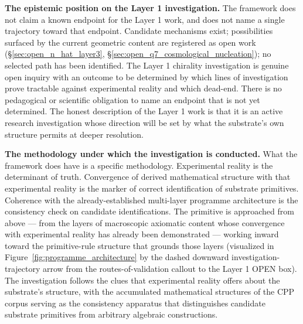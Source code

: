 \documentclass[11pt,letterpaper]{article}
\begin{document}
\textbf{The epistemic position on the Layer 1 investigation.} The framework does not claim a known endpoint for the Layer 1 work, and does not name a single trajectory toward that endpoint. Candidate mechanisms exist; possibilities surfaced by the current geometric content are registered as open work (\S\ref{sec:open_n_hat_layer3}, \S\ref{sec:open_q7_cosmological_nucleation}); no selected path has been identified. The Layer 1 chirality investigation is genuine open inquiry with an outcome to be determined by which lines of investigation prove tractable against experimental reality and which dead-end. There is no pedagogical or scientific obligation to name an endpoint that is not yet determined. The honest description of the Layer 1 work is that it is an active research investigation whose direction will be set by what the substrate's own structure permits at deeper resolution.

\textbf{The methodology under which the investigation is conducted.} What the framework does have is a specific methodology. Experimental reality is the determinant of truth. Convergence of derived mathematical structure with that experimental reality is the marker of correct identification of substrate primitives. Coherence with the already-established multi-layer programme architecture is the consistency check on candidate identifications. The primitive is approached from above --- from the layers of macroscopic axiomatic content whose convergence with experimental reality has already been demonstrated --- working inward toward the primitive-rule structure that grounds those layers (visualized in Figure~\ref{fig:programme_architecture} by the dashed downward investigation-trajectory arrow from the routes-of-validation callout to the Layer 1 OPEN box). The investigation follows the clues that experimental reality offers about the substrate's structure, with the accumulated mathematical structures of the CPP corpus serving as the consistency apparatus that distinguishes candidate substrate primitives from arbitrary algebraic constructions.
\end{document}
